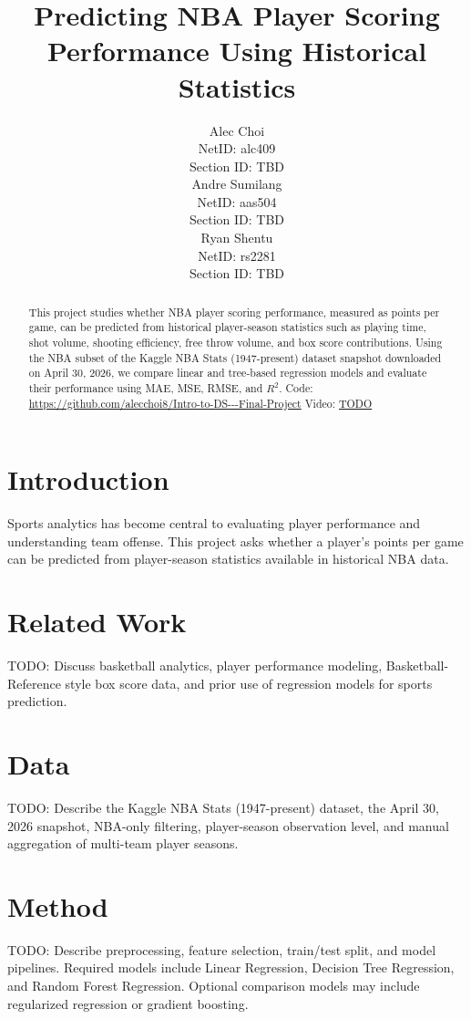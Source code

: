 \documentclass{article}
\title{Predicting NBA Player Scoring Performance Using Historical Statistics}
\author{%
  Alec Choi \\
  NetID: alc409 \\
  Section ID: TBD \\
  \And
  Andre Sumilang \\
  NetID: aas504 \\
  Section ID: TBD \\
  \And
  Ryan Shentu \\
  NetID: rs2281 \\
  Section ID: TBD \\
}
\begin{document}
\maketitle

\begin{abstract}
This project studies whether NBA player scoring performance, measured as points per game, can be predicted from historical player-season statistics such as playing time, shot volume, shooting efficiency, free throw volume, and box score contributions. Using the NBA subset of the Kaggle NBA Stats (1947-present) dataset snapshot downloaded on April 30, 2026, we compare linear and tree-based regression models and evaluate their performance using MAE, MSE, RMSE, and $R^2$. Code: \url{https://github.com/alecchoi8/Intro-to-DS---Final-Project} Video: \url{TODO}
\end{abstract}

\section{Introduction}

Sports analytics has become central to evaluating player performance and understanding team offense. This project asks whether a player's points per game can be predicted from player-season statistics available in historical NBA data.

\section{Related Work}

TODO: Discuss basketball analytics, player performance modeling, Basketball-Reference style box score data, and prior use of regression models for sports prediction.

\section{Data}

TODO: Describe the Kaggle NBA Stats (1947-present) dataset, the April 30, 2026 snapshot, NBA-only filtering, player-season observation level, and manual aggregation of multi-team player seasons.

\section{Method}

TODO: Describe preprocessing, feature selection, train/test split, and model pipelines. Required models include Linear Regression, Decision Tree Regression, and Random Forest Regression. Optional comparison models may include regularized regression or gradient boosting.
\end{document}
